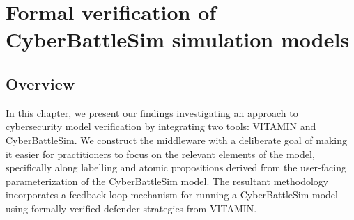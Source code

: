 \section{Formal verification of CyberBattleSim simulation models}
\label{sec:multiagent}
\subsection{Overview}

In this chapter, we present our findings investigating an approach to cybersecurity model verification by integrating two tools: VITAMIN and CyberBattleSim. We construct the middleware with a deliberate goal of making it easier for practitioners to focus on the relevant elements of the model, specifically along labelling and atomic propositions derived from the user-facing parameterization of the CyberBattleSim model. The resultant methodology incorporates a feedback loop mechanism for running a CyberBattleSim model using formally-verified defender strategies from VITAMIN. 


